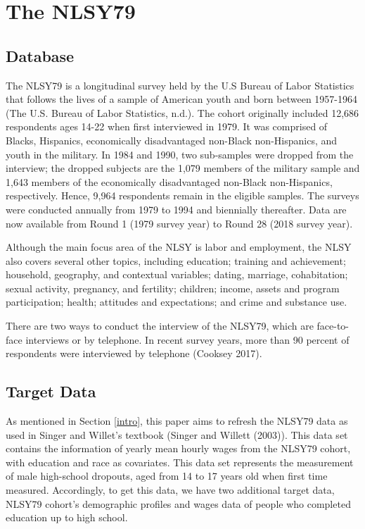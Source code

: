 \documentclass{article}
\begin{document}
\hypertarget{database}{%
\section{The NLSY79}\label{database}}

\hypertarget{database-1}{%
\subsection{Database}\label{database-1}}

The NLSY79 is a longitudinal survey held by the U.S Bureau of Labor Statistics that follows the lives of a sample of American youth and born between 1957-1964 (The U.S. Bureau of Labor Statistics, n.d.). The cohort originally included 12,686 respondents ages 14-22 when first interviewed in 1979. It was comprised of Blacks, Hispanics, economically disadvantaged non-Black non-Hispanics, and youth in the military. In 1984 and 1990, two sub-samples were dropped from the interview; the dropped subjects are the 1,079 members of the military sample and 1,643 members of the economically disadvantaged non-Black non-Hispanics, respectively. Hence, 9,964 respondents remain in the eligible samples. The surveys were conducted annually from 1979 to 1994 and biennially thereafter. Data are now available from Round 1 (1979 survey year) to Round 28 (2018 survey year).

Although the main focus area of the NLSY is labor and employment, the NLSY also covers several other topics, including education; training and achievement; household, geography, and contextual variables; dating, marriage, cohabitation; sexual activity, pregnancy, and fertility; children; income, assets and program participation; health; attitudes and expectations; and crime and substance use.

There are two ways to conduct the interview of the NLSY79, which are face-to-face interviews or by telephone. In recent survey years, more than 90 percent of respondents were interviewed by telephone (Cooksey 2017).

\hypertarget{target-data}{%
\subsection{Target Data}\label{target-data}}

As mentioned in Section \ref{intro}, this paper aims to refresh the NLSY79 data as used in Singer and Willet's textbook (Singer and Willett (2003)). This data set contains the information of yearly mean hourly wages from the NLSY79 cohort, with education and race as covariates. This data set represents the measurement of male high-school dropouts, aged from 14 to 17 years old when first time measured. Accordingly, to get this data, we have two additional target data, NLSY79 cohort's demographic profiles and wages data of people who completed education up to high school.
\end{document}
